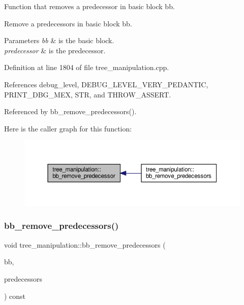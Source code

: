Function that removes a predecessor in basic block bb. 

Remove a predecessors in basic block bb.


\begin{DoxyParams}{Parameters}
{\em bb} & is the basic block. \\
\hline
{\em predecessor} & is the predecessor. \\
\hline
\end{DoxyParams}


Definition at line 1804 of file tree\+\_\+manipulation.\+cpp.



References debug\+\_\+level, D\+E\+B\+U\+G\+\_\+\+L\+E\+V\+E\+L\+\_\+\+V\+E\+R\+Y\+\_\+\+P\+E\+D\+A\+N\+T\+IC, P\+R\+I\+N\+T\+\_\+\+D\+B\+G\+\_\+\+M\+EX, S\+TR, and T\+H\+R\+O\+W\+\_\+\+A\+S\+S\+E\+RT.



Referenced by bb\+\_\+remove\+\_\+predecessors().

Here is the caller graph for this function\+:
\nopagebreak
\begin{figure}[H]
\begin{center}
\leavevmode
\includegraphics[width=350pt]{d0/d99/classtree__manipulation_abfe6499ab7971e2a1c2bbf4d7b39e28a_icgraph}
\end{center}
\end{figure}
\mbox{\label{classtree__manipulation_afd343f5c3f8f33b1af6f9fc68c9639fe}} 
\subsubsection{\texorpdfstring{bb\+\_\+remove\+\_\+predecessors()}{bb\_remove\_predecessors()}}
{\footnotesize\ttfamily void tree\+\_\+manipulation\+::bb\+\_\+remove\+\_\+predecessors (\begin{DoxyParamCaption}\item[{bloc\+Ref \&}]{bb,  }\item[{const std\+::vector$<$ unsigned int $>$ \&}]{predecessors }\end{DoxyParamCaption}) const}




